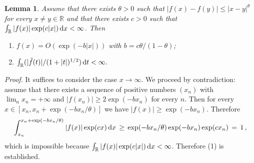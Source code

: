 \documentclass[reqno,11pt]{amsart}
\numberwithin{equation}{section}
\newtheorem{lemma}[theorem]{Lemma}
\newcommand{\dd}{\,\text{\rm d}}             %
\newcommand{\bbR}{{\ensuremath{\mathbb R}} }
\begin{document}
\medskip 

\begin{lemma}
\label{th:Leonardo}
Assume that there exists $\theta>0$ such that $\vert f(x)-f(y) \vert \le \vert x-y \vert ^\theta$ for every $x\neq y \in \bbR$ and that there exists
$c>0$ such that $\int_\bbR \vert f (x) \vert \exp(c \vert x \vert) \dd x < \infty$. Then
\begin{enumerate}
\item  $f(x)= O(\exp(-b \vert x \vert))$ with  $b= c\theta/(1-\theta)$;
\item 
$\int_\bbR ({ \vert \hat f (t)\vert }/{(1+\vert t \vert)^{1/2}}) \dd t < \infty.
$
\end{enumerate} 
\end{lemma}
\medskip

\noindent
\emph{Proof.} %
It suffices to consider the case $x \to \infty$. We proceed by contradiction: assume that  there exists a sequence of positive numbers $(x_n)$ with $\lim_n x_n=+ \infty$ and $\vert f(x_n) \vert \ge 2 \exp(-b x_n)$ for every $n$. 
Then for every $x \in [x_n, x_n+ \exp(-bx_n/ \theta)]$ we have 
$\vert f(x) \vert \ge \exp(-b x_n)$. Therefore
\begin{equation}
\int_{x_n}^{ x_n+ \exp(-bx_n/ \theta)} \vert f(x) \vert \exp(c x)  \dd x
\, \ge \, \exp(-bx_n/ \theta) \exp(-b x_n) \exp(c x_n) \, =\,1\, , 
\end{equation} 
which is impossible because $\int_\bbR \vert f (x) \vert \exp(c \vert x \vert) \dd x < \infty$. 
Therefore (1) is established.
\end{document}
